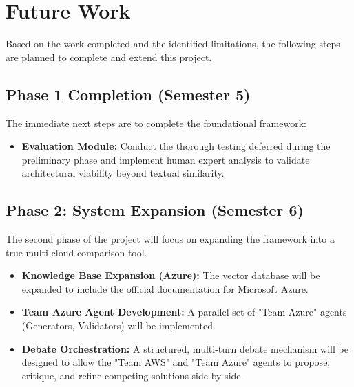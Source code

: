 \section{Future Work}
Based on the work completed and the identified limitations, the following steps are planned to complete and extend this project.

\subsection{Phase 1 Completion (Semester 5)}
The immediate next steps are to complete the foundational framework:
\begin{itemize}
    \item \textbf{Evaluation Module:} Conduct the thorough testing deferred during the preliminary phase and implement human expert analysis to validate architectural viability beyond textual similarity.
\end{itemize}

\subsection{Phase 2: System Expansion (Semester 6)}
The second phase of the project will focus on expanding the framework into a true multi-cloud comparison tool.
\begin{itemize}
    \item \textbf{Knowledge Base Expansion (Azure):} The vector database will be expanded to include the official documentation for Microsoft Azure.
    \item \textbf{Team Azure Agent Development:} A parallel set of "Team Azure" agents (Generators, Validators) will be implemented.
    \item \textbf{Debate Orchestration:} A structured, multi-turn debate mechanism will be designed to allow the "Team AWS" and "Team Azure" agents to propose, critique, and refine competing solutions side-by-side.
\end{itemize}